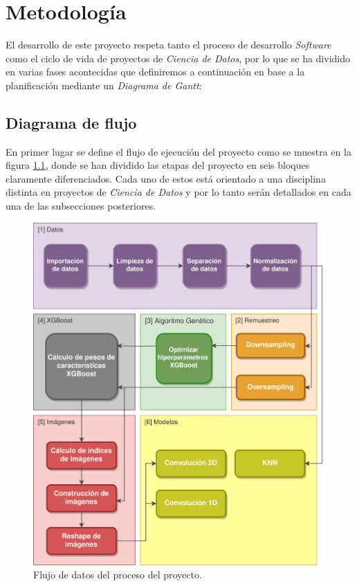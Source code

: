 
\chapter{Metodología}
\label{metodologia}

El desarrollo de este proyecto respeta tanto el proceso de desarrollo \textit{Software} como el ciclo de vida de proyectos de \textit{Ciencia de Datos}, por lo que se ha dividido en varias fases acontecidas que definiremos a continuación en base a la planificación mediante un \textit{Diagrama de Gantt}:


\section{Diagrama de flujo}

    En primer lugar se define el flujo de ejecución del proyecto como se muestra en la figura \ref{DataflowImage}, donde se han dividido las etapas del proyecto en seis bloques claramente diferenciados. Cada uno de estos está orientado a una disciplina distinta en proyectos de \textit{Ciencia de Datos} y por lo tanto serán detallados en cada una de las subsecciones posteriores.


    \begin{figure}[H]
        \centering
        \includegraphics[width=15cm]{archivos/DataflowImageESP}
        \caption{Flujo de datos del proceso del proyecto.}
        \label{DataflowImage}
    \end{figure}

